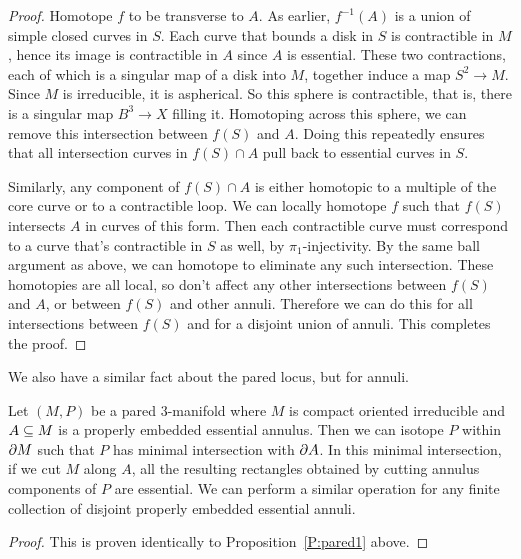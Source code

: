 \begin{proof}

Homotope $f$ to be transverse to $A$. As earlier, $f^{-1}(A)$ is a union of
simple closed curves in $S$. Each curve that bounds a disk in $S$ is
contractible in $M$, hence its image is contractible in $A$ since $A$ is
essential.  These two contractions, each of which is a singular map of a disk
into $M$, together induce a map $S^2 \to M$. Since $M$ is irreducible, it is
aspherical. So this sphere is contractible, that is, there is a singular map
$B^3 \to X$ filling it. Homotoping across this sphere, we can remove this
intersection between $f(S)$ and $A$. Doing this repeatedly ensures that all
intersection curves in $f(S) \cap A$ pull back to essential curves in $S$.

Similarly, any component of $f(S) \cap A$ is either homotopic to a multiple of
the core curve or to a contractible loop. We can locally homotope $f$ such that
$f(S)$ intersects $A$ in curves of this form. Then each contractible curve must
correspond to a curve that's contractible in $S$ as well, by
$\pi_1$-injectivity.  By the same ball argument as above, we can homotope to
eliminate any such intersection. These homotopies are all local, so don't
affect any other intersections between $f(S)$ and $A$, or between $f(S)$ and
other annuli. Therefore we can do this for all intersections between $f(S)$ and
for a disjoint union of annuli. This completes the proof.

\end{proof}

We also have a similar fact about the pared locus, but for annuli.

\begin{prop}

Let $(M,P)$ be a pared $3$-manifold where $M$ is compact oriented irreducible
and $A \subseteq M$ is a properly embedded essential annulus. Then we can isotope
$P$ within $\partial M$ such that $P$ has minimal intersection with $\partial A$.  In
this minimal intersection, if we cut $M$ along $A$, all the resulting
rectangles obtained by cutting annulus components of $P$ are essential.  We can
perform a similar operation for any finite collection of disjoint properly
embedded essential annuli.

\end{prop}

\begin{proof}

This is proven identically to Proposition~\ref{P:pared1} above.

\end{proof}

